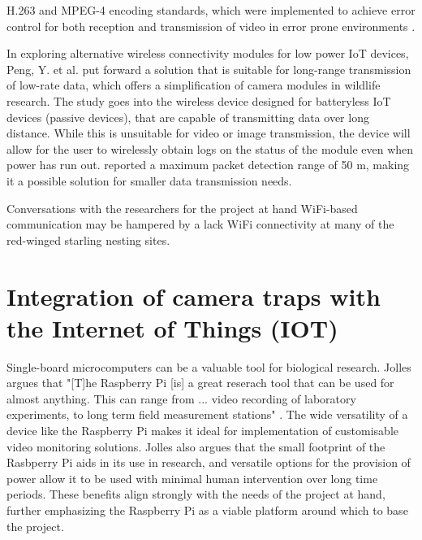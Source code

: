 \documentclass[class=report,11pt,crop=false]{standalone}
\begin{document}
\cite{adsumilli2002adaptive} H.263 and MPEG-4 encoding standards, which were implemented to achieve error control for both reception and transmission of video in error prone environments \cite{adsumilli2002adaptive}.

In exploring alternative wireless connectivity modules for low power IoT devices, Peng, Y. et al. \cite{peng2018plora} put forward a solution that is suitable for long-range transmission of low-rate data, which offers a simplification of camera modules in wildlife research. The study goes into the wireless device designed for batteryless IoT devices (passive devices), that are capable of transmitting data over long distance. While this is unsuitable for video or image transmission, the device will allow for the user to wirelessly obtain logs on the status of the module even when power has run out. \cite{peng2018plora} reported a maximum packet detection range of 50 m, making it a possible solution for smaller data transmission needs. %

Conversations with the researchers for the project at hand \cite{hofmeyer2024private} WiFi-based communication may be hampered by a lack WiFi connectivity at many of the red-winged starling nesting sites.

\section{Integration of camera traps with the Internet of Things (IOT)}

Single-board microcomputers can be a valuable tool for biological research. Jolles argues that "[T]he Raspberry Pi [is] a great reserach tool that can be used for almost anything. This can range from ... video recording of laboratory experiments, to long term field measurement stations" \cite{jolles2021broad-scale}. The wide versatility of a device like the Raspberry Pi makes it ideal for implementation of customisable video monitoring solutions. Jolles \cite{jolles2021broad-scale} also argues that the small footprint of the Rasbperry Pi aids in its use in research, and versatile options for the provision of power allow it to be used with minimal human intervention over long time periods. These benefits align strongly with the needs of the project at hand, further emphasizing the Raspberry Pi as a viable platform around which to base the project.
\end{document}
